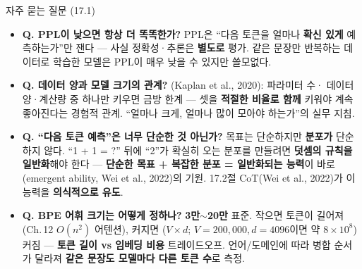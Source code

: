 \documentclass[aspectratio=169,11pt]{beamer}
\begin{document}
\begin{frame}{자주 묻는 질문 (17.1)}
  \begin{itemize}
    \item \textbf{Q. PPL이 낮으면 항상 더 똑똑한가?} PPL은
      ``다음 토큰을 얼마나 \textbf{확신 있게} 예측하는가''만
      잰다 — 사실 정확성·추론은 \textbf{별도로} 평가. 같은
      문장만 반복하는 데이터로 학습한 모델은 PPL이 매우 낮을
      수 있지만 쓸모없다. 
    \item \textbf{Q. 데이터 양과 모델 크기의 관계?}
      (Kaplan et al., 2020): 파라미터 수·
      데이터 양·계산량 중 하나만 키우면 금방 한계 --- 셋을
      \textbf{적절한 비율로 함께} 키워야 계속 좋아진다는
      경험적 관계. ``얼마나 크게, 얼마나 많이 모아야 하는가''의
      실무 지침.
    \item \textbf{Q. ``다음 토큰 예측''은 너무 단순한
      것 아닌가?} 목표는 단순하지만 \textbf{분포가} 단순하지
      않다. ``1 + 1 = ?'' 뒤에 ``2''가 확실히 오는 분포를
      만들려면 \textbf{덧셈의 규칙을 일반화}해야 한다 ---
      \textbf{단순한 목표 + 복잡한 분포 = 일반화되는 능력}이
      바로 (emergent ability, Wei et al., 2022)의
      기원. 17.2절 CoT(Wei et al., 2022)가 이 능력을
      \textbf{의식적으로 유도}.
    \item \textbf{Q. BPE 어휘 크기는 어떻게 정하나?}
      \textbf{3만$\sim$20만} 표준. 작으면 토큰이 길어져
      (Ch.\,12 $O(n^2)$ 어텐션), 커지면
      ($V \times d$; $V=200{,}000,
      d=4096$이면 약 $8 \times 10^8$) 커짐 — \textbf{토큰
      길이 vs 임베딩 비용} 트레이드오프. 언어/도메인에 따라
      병합 순서가 달라져 \textbf{같은 문장도 모델마다 다른
      토큰 수}로 측정.
  \end{itemize}
\end{frame}
\end{document}
